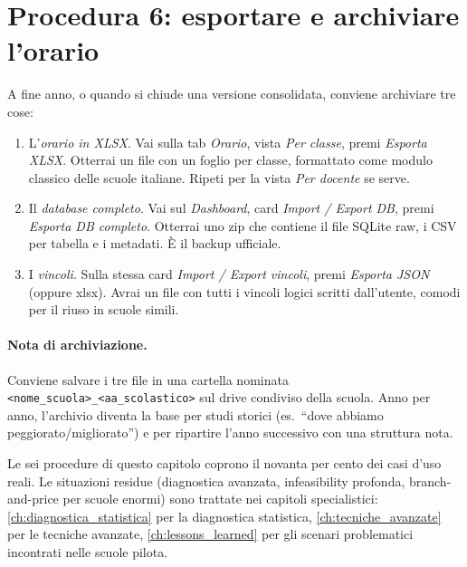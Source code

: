 
\section{Procedura 6: esportare e archiviare l'orario}
\label{sec:wf_export}

A fine anno, o quando si chiude una versione consolidata,
conviene archiviare tre cose:

\begin{enumerate}
\item L'\emph{orario in XLSX}. Vai sulla tab \emph{Orario},
  vista \emph{Per classe}, premi \emph{Esporta XLSX}. Otterrai
  un file con un foglio per classe, formattato come modulo
  classico delle scuole italiane. Ripeti per la vista \emph{Per
  docente} se serve.
\item Il \emph{database completo}. Vai sul \emph{Dashboard},
  card \emph{Import / Export DB}, premi \emph{Esporta DB
  completo}. Otterrai uno zip che contiene il file SQLite raw,
  i CSV per tabella e i metadati. \`E il backup ufficiale.
\item I \emph{vincoli}. Sulla stessa card \emph{Import / Export
  vincoli}, premi \emph{Esporta JSON} (oppure xlsx). Avrai un
  file con tutti i vincoli logici scritti dall'utente, comodi
  per il riuso in scuole simili.
\end{enumerate}

\paragraph{Nota di archiviazione.} Conviene salvare i tre file
in una cartella nominata \texttt{<nome\_scuola>\_<aa\_scolastico>}
sul drive condiviso della scuola. Anno per anno, l'archivio
diventa la base per studi storici (es.\ ``dove abbiamo
peggiorato/migliorato'') e per ripartire l'anno successivo con
una struttura nota.

\fleuron

\begin{biblioparvabox}
Le sei procedure di questo capitolo coprono il novanta per
cento dei casi d'uso reali. Le situazioni residue
(diagnostica avanzata, infeasibility profonda, branch-and-price
per scuole enormi) sono trattate nei capitoli specialistici:
\cref{ch:diagnostica_statistica} per la diagnostica statistica,
\cref{ch:tecniche_avanzate} per le tecniche
avanzate, \cref{ch:lessons_learned} per gli scenari
problematici incontrati nelle scuole pilota.
\end{biblioparvabox}

